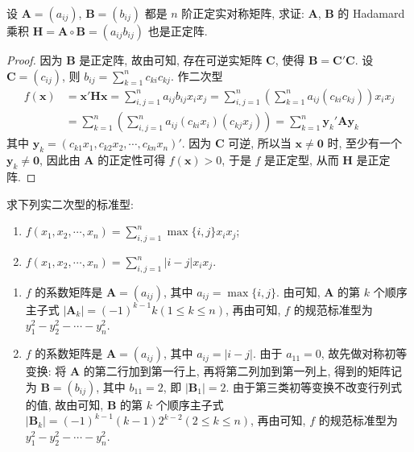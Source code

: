 \documentclass[../../main.tex]{subfiles}%
\begin{document}
\begin{proposition}\label{proposition:正定实对称阵的Hadamard积也正定}
设 \(\boldsymbol{A}=(a_{ij})\), \(\boldsymbol{B}=(b_{ij})\) 都是 \(n\) 阶正定实对称矩阵, 求证: \(\boldsymbol{A}\), \(\boldsymbol{B}\) 的 Hadamard 乘积 \(\boldsymbol{H}=\boldsymbol{A}\circ\boldsymbol{B}=(a_{ij}b_{ij})\) 也是正定阵.
\end{proposition}
\begin{proof}
因为 \(\boldsymbol{B}\) 是正定阵, 故由可知, 存在可逆实矩阵 \(\boldsymbol{C}\), 使得 \(\boldsymbol{B}=\boldsymbol{C}'\boldsymbol{C}\). 设 \(\boldsymbol{C}=(c_{ij})\), 则 \(b_{ij}=\sum_{k = 1}^{n}c_{ki}c_{kj}\). 作二次型
\begin{align*}
f(\boldsymbol{x})&=\boldsymbol{x}'\boldsymbol{H}\boldsymbol{x}=\sum_{i,j = 1}^{n}a_{ij}b_{ij}x_ix_j=\sum_{i,j = 1}^{n}\left(\sum_{k = 1}^{n}a_{ij}(c_{ki}c_{kj})\right)x_ix_j\\
&=\sum_{k = 1}^{n}\left(\sum_{i,j = 1}^{n}a_{ij}(c_{ki}x_i)(c_{kj}x_j)\right)=\sum_{k = 1}^{n}\boldsymbol{y}_k'\boldsymbol{A}\boldsymbol{y}_k
\end{align*}
其中 \(\boldsymbol{y}_k=(c_{k1}x_1,c_{k2}x_2,\cdots,c_{kn}x_n)'\). 因为 \(\boldsymbol{C}\) 可逆, 所以当 \(\boldsymbol{x}\neq\boldsymbol{0}\) 时, 至少有一个 \(\boldsymbol{y}_k\neq\boldsymbol{0}\), 因此由 \(\boldsymbol{A}\) 的正定性可得 \(f(\boldsymbol{x})>0\), 于是 \(f\) 是正定型, 从而 \(\boldsymbol{H}\) 是正定阵.
\end{proof}

\begin{example}
求下列实二次型的标准型:
\begin{enumerate}
\item \(f(x_1,x_2,\cdots,x_n)=\sum_{i,j = 1}^{n}\max\{i,j\}x_ix_j\);
\item \(f(x_1,x_2,\cdots,x_n)=\sum_{i,j = 1}^{n}|i - j|x_ix_j\).
\end{enumerate}
\end{example}
\begin{solution}
\begin{enumerate}
\item \(f\) 的系数矩阵是 \(\boldsymbol{A}=(a_{ij})\), 其中 \(a_{ij}=\max\{i,j\}\). 由可知, \(\boldsymbol{A}\) 的第 \(k\) 个顺序主子式 \(|\boldsymbol{A}_k|=(-1)^{k - 1}k(1\leqslant  k\leqslant  n)\), 再由可知, \(f\) 的规范标准型为 \(y_1^2 - y_2^2 - \cdots - y_n^2\).
\item \(f\) 的系数矩阵是 \(\boldsymbol{A}=(a_{ij})\), 其中 \(a_{ij}=|i - j|\). 由于 \(a_{11}=0\), 故先做对称初等变换: 将 \(\boldsymbol{A}\) 的第二行加到第一行上, 再将第二列加到第一列上, 得到的矩阵记为 \(\boldsymbol{B}=(b_{ij})\), 其中 \(b_{11}=2\), 即 \(|\boldsymbol{B}_1| = 2\). 由于第三类初等变换不改变行列式的值, 故由可知, \(\boldsymbol{B}\) 的第 \(k\) 个顺序主子式 \(|\boldsymbol{B}_k|=(-1)^{k - 1}(k - 1)2^{k - 2}(2\leqslant  k\leqslant  n)\), 再由可知, \(f\) 的规范标准型为 \(y_1^2 - y_2^2 - \cdots - y_n^2\). 
\end{enumerate} 

\end{solution}
\end{document}
